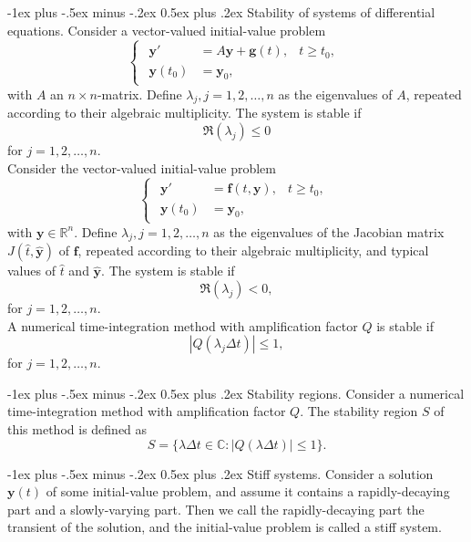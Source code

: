 \documentclass[10pt,landscape,a4paper]{article}
\makeatletter
\newcommand{\R}{\mathbb{R}}
\renewcommand{\section}{\@startsection{section}{1}{0mm}%
	{-1ex plus -.5ex minus -.2ex}%
	{0.5ex plus .2ex}%
	{\normalfont\large\bfseries}}
\makeatother
\begin{document}
\begin{multicols}{3}
	\section{Stability of systems of differential equations.}
	Consider a vector-valued initial-value problem
	\[
		\begin{cases}
			\begin{aligned}
				\textbf{y}'     & =A\textbf{y}+\textbf{g}(t), & t\geq t_0, \\
				\textbf{y}(t_0) & =\textbf{y}_0,              & 
			\end{aligned}
		\end{cases}
	\]
	with $ A $ an $ n\times n $-matrix. Define $ \lambda_j,j=1,2,\hdots,n $ as the eigenvalues of $ A $, repeated according to their algebraic multiplicity.
	The system is stable if
	\[
		\Re(\lambda_j)\leq0
	\]
	for $ j=1,2,\hdots,n $.\\
	Consider the vector-valued initial-value problem
	\[
		\begin{cases}
			\begin{aligned}
				\textbf{y}'     & =\textbf{f}(t,\textbf{y}), & t\geq t_0, \\
				\textbf{y}(t_0) & =\textbf{y}_0,             & 
			\end{aligned}
		\end{cases}
	\]
	with $ \textbf{y}\in\R^n $. Define $ \lambda_j,j=1,2,\hdots,n $ as the eigenvalues of the Jacobian matrix $ J(\hat{t},\hat{\textbf{y}}) $ of $ \textbf{f} $, repeated according to their algebraic multiplicity, and typical values of $ \hat{t} $ and $ \hat{\textbf{y}} $. The system is stable if
	\[
		\Re(\lambda_j)<0,
	\]
	for $ j=1,2,\hdots,n $.\\
	A numerical time-integration method with amplification factor $ Q $ is stable if
	\[
		|Q(\lambda_j\Delta t)|\leq 1,
	\]
	for $ j=1,2,\hdots,n $.
	
	\section{Stability regions.}
	Consider a numerical time-integration method with amplification factor $ Q $. The stability region $ S $ of this method is defined as
	\[
		S=\{\lambda\Delta t\in \mathbb{C}:|Q(\lambda\Delta t)|\leq 1\}.
	\]
	
	\section{Stiff systems.}
	Consider a solution $ \textbf{y}(t) $ of some initial-value problem, and assume it contains a rapidly-decaying part and a slowly-varying part. Then we call the rapidly-decaying part the transient of the solution, and the initial-value problem is called a stiff system.
	

\end{multicols}
\end{document}

